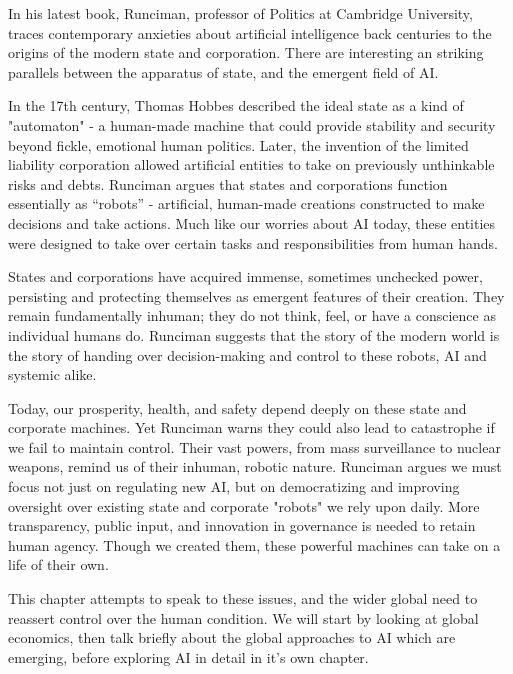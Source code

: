 In his latest book, Runciman, professor of Politics at Cambridge University, traces contemporary anxieties about artificial intelligence back centuries to the origins of the modern state and corporation. There are interesting an striking parallels between the apparatus of state, and the emergent field of AI. \par
In the 17th century, Thomas Hobbes described the ideal state as a kind of "automaton" - a human-made machine that could provide stability and security beyond fickle, emotional human politics. Later, the invention of the limited liability corporation allowed artificial entities to take on previously unthinkable risks and debts. Runciman argues that states and corporations function essentially as ``robots'' - artificial, human-made creations constructed to make decisions and take actions. Much like our worries about AI today, these entities were designed to take over certain tasks and responsibilities from human hands.\par
States and corporations have acquired immense, sometimes unchecked power, persisting and protecting themselves as emergent features of their creation. They remain fundamentally inhuman; they do not think, feel, or have a conscience as individual humans do. Runciman suggests that the story of the modern world is the story of handing over decision-making and control to these robots, AI and systemic alike.\par
Today, our prosperity, health, and safety depend deeply on these state and corporate machines. Yet Runciman warns they could also lead to catastrophe if we fail to maintain control. Their vast powers, from mass surveillance to nuclear weapons, remind us of their inhuman, robotic nature. Runciman argues we must focus not just on regulating new AI, but on democratizing and improving oversight over existing state and corporate "robots" we rely upon daily. More transparency, public input, and innovation in governance is needed to retain human agency. Though we created them, these powerful machines can take on a life of their own.\par
This chapter attempts to speak to these issues, and the wider global need to reassert control over the human condition. We will start by looking at global economics, then talk briefly about the global approaches to AI which are emerging, before exploring AI in detail in it's own chapter.\par
